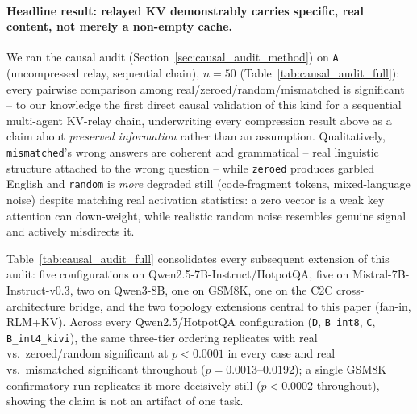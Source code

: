 \documentclass[11pt]{article}
\begin{document}
\paragraph{Headline result: relayed KV demonstrably carries specific, real
content, not merely a non-empty cache.} We ran the causal audit
(Section~\ref{sec:causal_audit_method}) on \texttt{A} (uncompressed
relay, sequential chain), $n=50$ (Table~\ref{tab:causal_audit_full}):
every pairwise comparison among real/zeroed/random/mismatched is
significant -- to our knowledge the first direct causal validation of
this kind for a sequential multi-agent KV-relay chain, underwriting every
compression result above as a claim about \emph{preserved information}
rather than an assumption. Qualitatively, \texttt{mismatched}'s wrong
answers are coherent and grammatical -- real linguistic structure
attached to the wrong question -- while \texttt{zeroed} produces garbled
English and \texttt{random} is \emph{more} degraded still (code-fragment
tokens, mixed-language noise) despite matching real activation
statistics: a zero vector is a weak key attention can down-weight, while
realistic random noise resembles genuine signal and actively misdirects
it.

Table~\ref{tab:causal_audit_full} consolidates every subsequent extension
of this audit: five configurations on Qwen2.5-7B-Instruct/HotpotQA, five
on Mistral-7B-Instruct-v0.3, two on Qwen3-8B, one on GSM8K, one on the
C2C cross-architecture bridge, and the two topology extensions central to
this paper (fan-in, RLM+KV). Across every Qwen2.5/HotpotQA configuration
(\texttt{D}, \texttt{B\_int8}, \texttt{C}, \texttt{B\_int4\_kivi}), the
same three-tier ordering replicates with real vs.\ zeroed/random
significant at $p<0.0001$ in every case and real vs.\ mismatched
significant throughout ($p=0.0013$--$0.0192$); a single GSM8K
\citep{gsm8k2021} confirmatory run replicates it more decisively still
($p<0.0002$ throughout), showing the claim is not an artifact of one
task.
\end{document}
